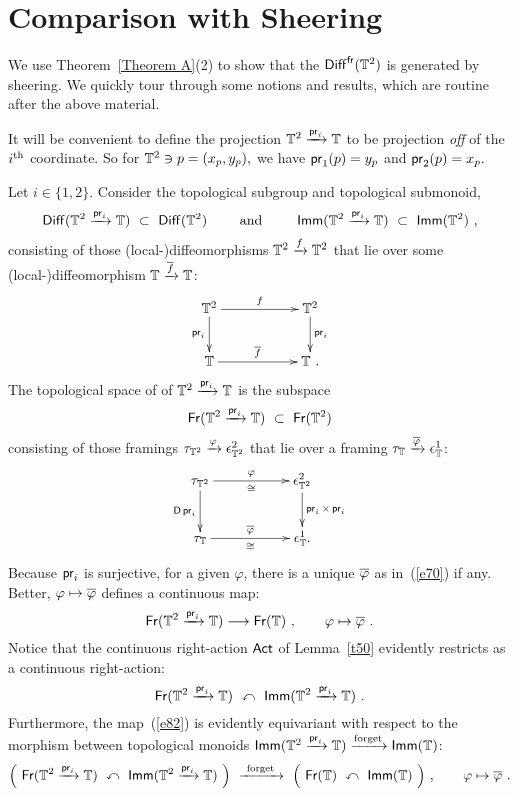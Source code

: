 \section{Comparison with Sheering}
We use Theorem~\ref{Theorem A}(2) to show that the $\operatorname{{\sf Diff}}^{\operatorname{\sf fr}}(\mathbb T^2)$ is generated by sheering.  
We quickly tour through some notions and results, which are routine after the above material.  

\begin{notation}
It will be convenient to define the projection $\mathbb T^{2} \xrightarrow{\operatorname{\mathsf{pr}}_{i}} \mathbb T$ to be projection \emph{off} of the $i^{\rm th}$ coordinate. 
So for $\mathbb T^{2} \ni p = (x_{p}, y_{p}),$ we have $\operatorname{\mathsf{pr}}_{1}(p) = y_{p}$ and $\operatorname{\mathsf{pr}}_{2}(p) = x_{p}.$
\end{notation}

Let $i\in \{1,2\}$.
Consider the topological subgroup and topological submonoid,
\[
\operatorname{{\sf Diff}}(\mathbb T^2 \xrightarrow{\operatorname{\mathsf{pr}}_i} \mathbb T)
~\subset~
\operatorname{{\sf Diff}}(\mathbb T^2)
\qquad
\text{ and }
\qquad
\operatorname{\sf Imm}(\mathbb T^2 \xrightarrow{\operatorname{\mathsf{pr}}_i} \mathbb T)
~\subset~
\operatorname{\sf Imm}(\mathbb T^2)
~,
\]
consisting of those (local-)diffeomorphisms $\mathbb T^2\xrightarrow{f} \mathbb T^2$ that lie over some (local-)diffeomorphism $\mathbb T\xrightarrow{\overline{f}} \mathbb T$:
\begin{equation}
\label{e87}
\xymatrix{
\TT^2
\ar[rr]^-f
\ar[d]_-{\pr_i}
&&
\TT^2 \ar[d]^-{\pr_i}
\\
\TT
\ar[rr]^-{\ov{f}}
&&
\TT
~.
}
\end{equation}
The topological space of  of $\mathbb T^2 \xrightarrow{\operatorname{\mathsf{pr}}_i} \mathbb T$ is the subspace
\[
\operatorname{\sf Fr}(\mathbb T^2 \xrightarrow{\operatorname{\mathsf{pr}}_i} \mathbb T)
~\subset~
\operatorname{\sf Fr}(\mathbb T^2)
\]
consisting of those framings $\tau_{\mathbb T^2}\xrightarrow{\varphi} \epsilon^2_{\mathbb T^2}$ that lie over a framing $\tau_{\mathbb T} \xrightarrow{\overline{\varphi}} \epsilon^1_{\mathbb T}$:
\begin{equation}
\label{e70}
\xymatrix{
\tau_{\TT^2}
\ar[rr]^-{\varphi}_-{\cong}
\ar[d]_-{\sD \pr_i}
&&
\epsilon^2_{\TT^2}
\ar[d]^-{\pr_i \times \pr_i}
\\
\tau_{\TT}
\ar[rr]^-{\ov{\varphi}}_-{\cong}
&&
\epsilon^1_{\TT}
.
}
\end{equation}
Because $\operatorname{\mathsf{pr}}_i$ is surjective, for a given $\varphi$, there is a unique $\overline{\varphi}$ as in~(\ref{e70}) if any.  
Better, $\varphi\mapsto \overline{\varphi}$ defines a continuous map:
\begin{equation}
\label{e82}
\operatorname{\sf Fr}(\mathbb T^2 \xrightarrow{\operatorname{\mathsf{pr}}_i} \mathbb T)
\longrightarrow
\operatorname{\sf Fr}(\mathbb T)
~,\qquad
\varphi
\mapsto 
\overline{\varphi}
~.
\end{equation}
Notice that the continuous right-action $\operatorname{\sf Act}$ of Lemma~\ref{t50} evidently restricts as a continuous right-action:
\[
\operatorname{\sf Fr}(\mathbb T^2 \xrightarrow{\operatorname{\mathsf{pr}}_i} \mathbb T)
~\curvearrowleft~
\operatorname{\sf Imm}(\mathbb T^2 \xrightarrow{\operatorname{\mathsf{pr}}_i} \mathbb T)
~.
\]
Furthermore, the map~(\ref{e82}) is evidently equivariant with respect to the morphism between topological monoids $\operatorname{\sf Imm}(\mathbb T^2 \xrightarrow{\operatorname{\mathsf{pr}}_i} \mathbb T) \xrightarrow{\rm forget} \operatorname{\sf Imm}(\mathbb T)$:
\[
\Bigl(
~
\operatorname{\sf Fr}(\mathbb T^2 \xrightarrow{\operatorname{\mathsf{pr}}_i} \mathbb T)
~\curvearrowleft~
\operatorname{\sf Imm}(\mathbb T^2 \xrightarrow{\operatorname{\mathsf{pr}}_i} \mathbb T)
~\Bigr)
~
\xrightarrow{~\rm forget~}
~
\Bigl(
~
\operatorname{\sf Fr}(\mathbb T)
~\curvearrowleft~
\operatorname{\sf Imm}(\mathbb T)
~\Bigr)
~,\qquad
\varphi
\mapsto 
\overline{\varphi}
~.
\]






